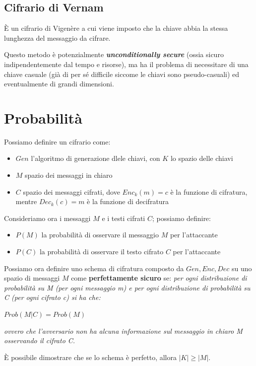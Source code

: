 \subsection{Cifrario di Vernam}
È un cifrario di Vigenère a cui viene imposto che la chiave abbia la stessa lunghezza del messaggio da cifrare.

\noindent Questo metodo è potenzialmente \textbf{\textit{unconditionally secure}} (ossia sicuro indipendentemente dal tempo e risorse), ma 
ha il problema di necessitare di una chiave casuale (già di per sé difficile siccome le chiavi sono pseudo-casuali) ed eventualmente di grandi 
dimensioni.


\section{Probabilità}

Possiamo definire un cifrario come:
\begin{itemize}
    \item $Gen$ l'algoritmo di generazione dlele chiavi, con $K$ lo spazio delle chiavi 
    \item $M$ spazio dei messaggi in chiaro 
    \item $C$ spazio dei messaggi cifrati, dove $Enc_k(m)=c$ è la funzione di cifratura, mentre $Dec_k(c)=m$ è la funzione di decifratura
\end{itemize}

\noindent Consideriamo ora i messaggi $M$ e i testi cifrati $C$; possiamo definire:
\begin{itemize}
    \item $P(M)$ la probabilità di osservare il messaggio $M$ per l'attaccante 
    \item $P(C)$ la probabilità di osservare il testo cifrato $C$ per l'attaccante 
\end{itemize}

\noindent Possiamo ora definire uno schema di cifratura composto da $Gen, Enc, Dec$ su uno spazio di messaggi $M$
come \textbf{perfettamente sicuro} se: \textit{per ogni distribuzione di probabilità su M (per ogni messaggio m) e per ogni 
distribuzione di probabilità su C (per ogni cifrato c) si ha che:}
\begin{center}
    $Prob(M|C) = Prob(M)$
\end{center}

\noindent \textit{ovvero che l'avversario non ha alcuna informazione sul messaggio in chiaro M osservando il cifrato C.}

\noindent È possibile dimostrare che se lo schema è perfetto, allora $|K| \geq |M|$.